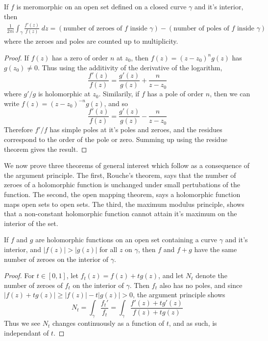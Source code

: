 \begin{theorem}
    If $f$ is meromorphic on an open set defined on a closed curve $\gamma$ and it's interior, then
    \begin{align*}
        \frac{1}{2\pi i} \int_\gamma \frac{f'(z)}{f(z)}\; dz = (\text{number of zeroes of $f$ inside $\gamma$}) - (\text{number of poles of $f$ inside $\gamma$})
    \end{align*}
    where the zeroes and poles are counted up to multiplicity.
\end{theorem}
\begin{proof}
    If $f(z)$ has a zero of order $n$ at $z_0$, then $f(z) = (z - z_0)^n g(z)$ has $g(z_0) \neq 0$. Thus using the additivity of the derivative of the logarithm,
    \[ \frac{f'(z)}{f(z)} = \frac{g'(z)}{g(z)} + \frac{n}{z - z_0} \]
    where $g'/g$ is holomorphic at $z_0$. Similarily, if $f$ has a pole of order $n$, then we can write $f(z) = (z - z_0)^{-n} g(z)$, and so
    \[ \frac{f'(z)}{f(z)} = \frac{g'(z)}{g(z)} - \frac{n}{z - z_0} \]
    Therefore $f'/f$ has simple poles at it's poles and zeroes, and the residues correspond to the order of the pole or zero. Summing up using the residue theorem gives the result.
\end{proof}

We now prove three theorems of general interest which follow as a consequence of the argument principle. The first, Rouche's theorem, says that the number of zeroes of a holomorphic function is unchanged under small pertubations of the function. The second, the open mapping theorem, says a holomorphic function maps open sets to open sets. The third, the maximum modulus principle, shows that a non-constant holomorphic function cannot attain it's maximum on the interior of the set.

\begin{theorem}[Rouche]
    If $f$ and $g$ are holomorphic functions on an open set containing a curve $\gamma$ and it's interior, and $|f(z)| > |g(z)|$ for all $z$ on $\gamma$, then $f$ and $f + g$ have the same number of zeroes on the interior of $\gamma$.
\end{theorem}
\begin{proof}
    For $t \in [0,1]$, let $f_t(z) = f(z) + tg(z)$, and let $N_t$ denote the number of zeroes of $f_t$ on the interior of $\gamma$. Then $f_t$ also has no poles, and since $|f(z) + tg(z)| \geq |f(z)| - t|g(z)| > 0$, the argument principle shows
    \[ N_t = \int_\gamma \frac{f_t'}{f_t} = \int_\gamma \frac{f'(z) + tg'(z)}{f(z) + tg(z)} \]
    Thus we see $N_t$ changes continuously as a function of $t$, and as such, is independant of $t$.
\end{proof}

